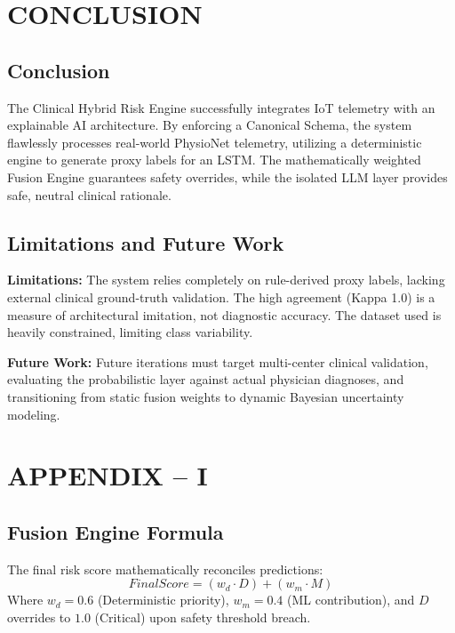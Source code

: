 \documentclass[12pt,a4paper]{report}
\begin{document}
\chapter{CONCLUSION}

\section{Conclusion}
The Clinical Hybrid Risk Engine successfully integrates IoT telemetry with an explainable AI architecture. By enforcing a Canonical Schema, the system flawlessly processes real-world PhysioNet telemetry, utilizing a deterministic engine to generate proxy labels for an LSTM. The mathematically weighted Fusion Engine guarantees safety overrides, while the isolated LLM layer provides safe, neutral clinical rationale. 

\section{Limitations and Future Work}
\textbf{Limitations:} The system relies completely on rule-derived proxy labels, lacking external clinical ground-truth validation. The high agreement (Kappa 1.0) is a measure of architectural imitation, not diagnostic accuracy. The dataset used is heavily constrained, limiting class variability.

\textbf{Future Work:} Future iterations must target multi-center clinical validation, evaluating the probabilistic layer against actual physician diagnoses, and transitioning from static fusion weights to dynamic Bayesian uncertainty modeling.

\newpage
\chapter*{APPENDIX -- I}

\section*{Fusion Engine Formula}
The final risk score mathematically reconciles predictions:
\begin{equation}
FinalScore = (w_d \cdot D) + (w_m \cdot M)
\end{equation}
Where $w_d = 0.6$ (Deterministic priority), $w_m = 0.4$ (ML contribution), and $D$ overrides to $1.0$ (Critical) upon safety threshold breach.
\end{document}
